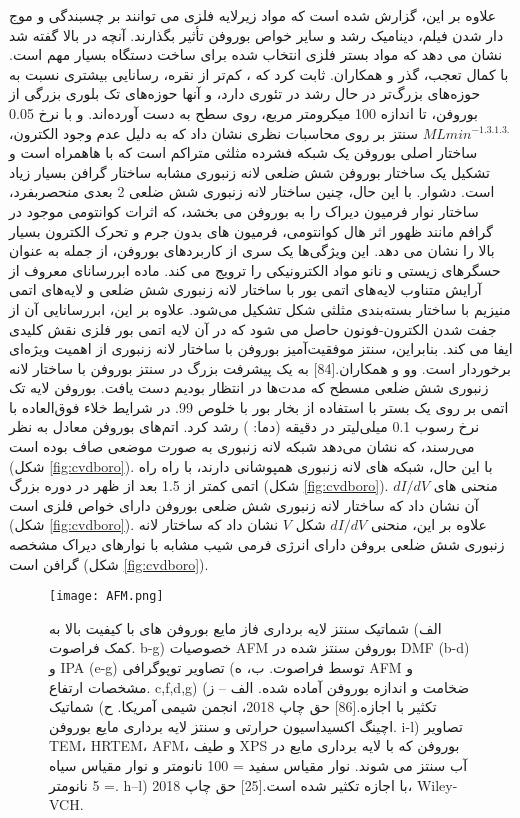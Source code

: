 علاوه بر این، گزارش شده است که مواد زیرلایه فلزی می توانند بر چسبندگی و موج دار شدن فیلم، دینامیک رشد و سایر خواص بوروفن تأثیر بگذارند. آنچه در بالا گفته شد نشان می دهد که مواد بستر فلزی انتخاب شده برای ساخت دستگاه بسیار مهم است. با کمال تعجب، گذر و همکاران. ثابت کرد که ، کم‌تر از نقره، رسانایی بیشتری نسبت به حوزه‌های بزرگ‌تر در حال رشد در تئوری دارد، و آنها حوزه‌های تک بلوری بزرگی از بوروفن، تا اندازه 100 میکرومتر مربع، روی سطح  به دست آورده‌اند.  و با نرخ 0.05 $ML min^{-1. 3.1.3.}$ سنتز بر روی  محاسبات نظری نشان داد که به دلیل عدم وجود الکترون، ساختار اصلی بوروفن یک شبکه فشرده مثلثی متراکم است که با  ‌هاهمراه است و تشکیل یک ساختار بوروفن شش ضلعی لانه زنبوری مشابه ساختار گرافن بسیار زیاد است. دشوار. با این حال، چنین ساختار لانه زنبوری شش ضلعی 2 بعدی منحصربفرد، ساختار نوار فرمیون دیراک را به بوروفن می بخشد، که اثرات کوانتومی موجود در گرافم مانند ظهور اثر هال کوانتومی، فرمیون های بدون جرم و تحرک الکترون بسیار بالا را نشان می دهد. این ویژگی‌ها یک سری از کاربردهای بوروفن، از جمله به عنوان حسگرهای زیستی و نانو مواد الکترونیکی را ترویج می کند. ماده ابررسانای معروف  از آرایش متناوب لایه‌های اتمی بور با ساختار لانه زنبوری شش ضلعی و لایه‌های اتمی منیزیم با ساختار بسته‌بندی مثلثی شکل تشکیل می‌شود. علاوه بر این، ابررسانایی آن از جفت شدن الکترون-فونون حاصل می شود که در آن لایه اتمی بور فلزی نقش کلیدی ایفا می کند. بنابراین، سنتز موفقیت‌آمیز بوروفن با ساختار لانه زنبوری از اهمیت ویژه‌ای برخوردار است. وو و همکاران.\cite{liSurfaceMorphologyElectrical2018}[84] به یک پیشرفت بزرگ در سنتز بوروفن با ساختار لانه زنبوری شش ضلعی مسطح که مدت‌ها در انتظار بودیم دست یافت. بوروفن لایه تک اتمی بر روی یک بستر  با استفاده از بخار بور با خلوص 99. در شرایط خلاء فوق‌العاده با نرخ رسوب 0.1 میلی‌لیتر در دقیقه (دما: ) رشد کرد. اتم‌های بوروفن معادل به نظر می‌رسند، که نشان می‌دهد شبکه لانه زنبوری به صورت موضعی صاف بوده است (شکل \ref{fig:cvdboro}). با این حال، شبکه های لانه زنبوری همپوشانی دارند، با راه راه اتمی کمتر از 1.5 بعد از ظهر در دوره بزرگ (شکل \ref{fig:cvdboro}). منحنی های $dI/dV$ آن نشان داد که ساختار لانه زنبوری شش ضلعی بوروفن دارای خواص فلزی است (شکل \ref{fig:cvdboro}). علاوه بر این، منحنی $dI/dV$ شکل $V$ نشان داد که ساختار لانه زنبوری شش ضلعی بروفن دارای انرژی فرمی شیب مشابه با نوارهای دیراک مشخصه گرافن است (شکل \ref{fig:cvdboro}). 
\begin{figure*}
    \centering
    \texttt{[image: AFM.png]}
    \caption{الف) شماتیک سنتز لایه برداری فاز مایع بوروفن های با کیفیت بالا به کمک فراصوت. b-g) خصوصیات AFM بوروفن سنتز شده در DMF (b-d) و IPA (e-g) توسط فراصوت. ب، ه) تصاویر توپوگرافی AFM و مشخصات ارتفاع. c,f,d,g) ضخامت و اندازه بوروفن آماده شده. الف – ز) تکثیر با اجازه.[86] حق چاپ 2018، انجمن شیمی آمریکا. ح) شماتیک اچینگ اکسیداسیون حرارتی و سنتز لایه برداری مایع بوروفن. i-l) تصاویر TEM، HRTEM، AFM، و طیف XPS بوروفن که با لایه برداری مایع در آب سنتز می شوند. نوار مقیاس سفید = 100 نانومتر و نوار مقیاس سیاه = 5 نانومتر. h–l) با اجازه تکثیر شده است.[25] حق چاپ 2018، Wiley-VCH.}
    \label{fig:afm}
\end{figure*}
